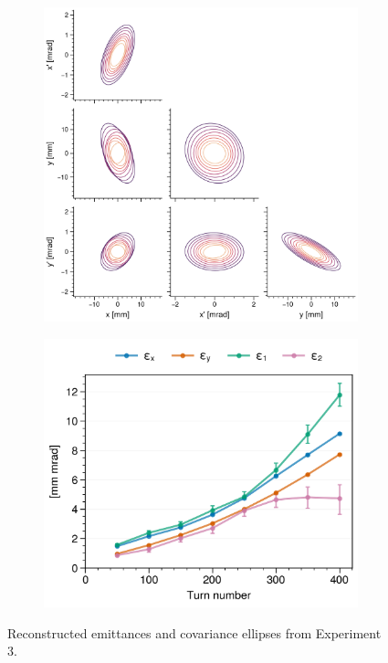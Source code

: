 \begin{figure}[!p]
    \centering
    \begin{subfigure}{0.6\textwidth}
        \includegraphics[width=\textwidth]{Images/chapter5/exp3/corner.png}
    \end{subfigure}
    \hfill
    \begin{subfigure}[t]{0.39\textwidth}
        \includegraphics[width=\textwidth]{Images/chapter5/exp3/emittances.png}
    \end{subfigure}
    \caption{Reconstructed emittances and covariance ellipses from Experiment 3.}
    \label{fig:exp3_emittances}
\end{figure}
% 

